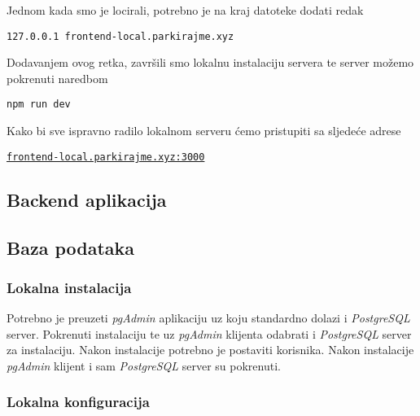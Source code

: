		        Jednom kada smo je locirali, potrebno je na kraj datoteke dodati redak

		        \begin{center}
	                \texttt{127.0.0.1	frontend-local.parkirajme.xyz}
		        \end{center}
		        
		        Dodavanjem ovog retka, završili smo lokalnu instalaciju servera te server možemo pokrenuti naredbom
		        
		        \begin{center}
	                \texttt{npm run dev}
		        \end{center}
		        
		        Kako bi sve ispravno radilo lokalnom serveru ćemo pristupiti sa sljedeće adrese

		        \begin{center}
	                \href{http://frontend-local.parkirajme.xyz:3000/}{\texttt{frontend-local.parkirajme.xyz:3000}}
		        \end{center}
		        
		    \pagebreak
		    
	        \subsection{Backend aplikacija}
		    
		    \pagebreak
		    
	        \subsection{Baza podataka}
		
		    \subsubsection*{Lokalna instalacija}
		    
		        Potrebno je preuzeti \textit{pgAdmin} aplikaciju uz koju standardno dolazi i \textit{PostgreSQL} server. Pokrenuti instalaciju te uz \textit{pgAdmin} klijenta odabrati i \textit{PostgreSQL} server za instalaciju. Nakon instalacije potrebno je postaviti korisnika. Nakon instalacije \textit{pgAdmin} klijent i sam \textit{PostgreSQL} server su pokrenuti.
		        
		    \subsubsection*{Lokalna konfiguracija}
		        
